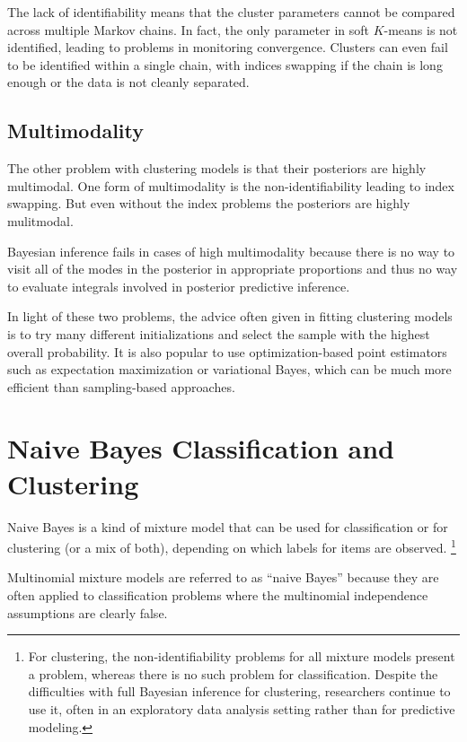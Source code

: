 The lack of identifiability means that the cluster parameters
cannot be compared across multiple Markov chains.  In fact, the only
parameter in soft $K$-means is not identified, leading to problems in
monitoring convergence.  Clusters can even fail to be identified
within a single chain, with indices swapping if the chain is long
enough or the data is not cleanly separated. 

\subsection{Multimodality}

The other problem with clustering models is that their posteriors are
highly multimodal.  One form of multimodality is the
non-identifiability leading to index swapping.  But even without
the index problems the posteriors are highly mulitmodal.

Bayesian inference fails in cases of high multimodality because there
is no way to visit all of the modes in the posterior in appropriate
proportions and thus no way to evaluate integrals involved in
posterior predictive inference.

In light of these two problems, the advice often given in fitting
clustering models is to try many different initializations and select
the sample with the highest overall probability.  It is also popular
to use optimization-based point estimators such as expectation
maximization or variational Bayes, which can be much more efficient
than sampling-based approaches.


\section{Naive Bayes Classification and Clustering}

Naive Bayes is a kind of mixture model that can be used for
classification or for clustering (or a mix of both), depending on
which labels for items are observed.%
%
\footnote{For clustering, the non-identifiability problems for all
  mixture models present a problem, whereas there is no such problem
  for classification.  Despite the difficulties with full Bayesian
  inference for clustering, researchers continue to use it, often in
  an exploratory data analysis setting rather than for predictive
  modeling.}

Multinomial mixture models are referred to as ``naive Bayes'' because
they are often applied to classification problems where the
multinomial independence assumptions are clearly false. 

